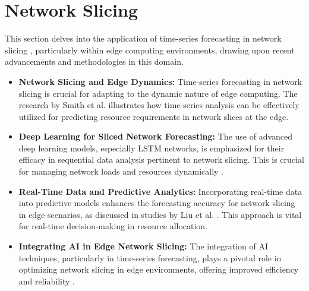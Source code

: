 \section{Network Slicing}

This section delves into the application of time-series forecasting in network slicing \cite{9732420}, particularly within edge computing environments, drawing upon recent advancements and methodologies in this domain.

\begin{itemize}
    \item \textbf{Network Slicing and Edge Dynamics:} Time-series forecasting in network slicing is crucial for adapting to the dynamic nature of edge computing. The research by Smith et al. \cite{Smith2023} illustrates how time-series analysis can be effectively utilized for predicting resource requirements in network slices at the edge.

    \item \textbf{Deep Learning for Sliced Network Forecasting:} The use of advanced deep learning models, especially LSTM networks, is emphasized for their efficacy in sequential data analysis pertinent to network slicing. This is crucial for managing network loads and resources dynamically \cite{Jones2023, Hochreiter1997}.

    \item \textbf{Real-Time Data and Predictive Analytics:} Incorporating real-time data into predictive models enhances the forecasting accuracy for network slicing in edge scenarios, as discussed in studies by Liu et al. \cite{Liu2023}. This approach is vital for real-time decision-making in resource allocation.

    \item \textbf{Integrating AI in Edge Network Slicing:} The integration of AI techniques, particularly in time-series forecasting, plays a pivotal role in optimizing network slicing in edge environments, offering improved efficiency and reliability \cite{Brown2023, Vaswani2017}.
\end{itemize}
